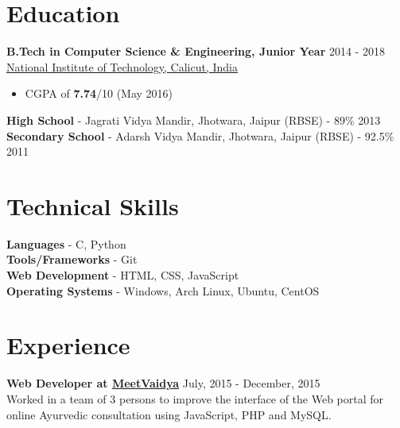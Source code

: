 \documentclass[margin, centered]{res}
\begin{document}
\begin{resume}

\section{Education}
\textbf{B.Tech in Computer Science \& Engineering, Junior Year} \hfill 2014 - 2018 \\
\href{http://nitc.ac.in/}{National Institute of Technology, Calicut, India}
\begin{itemize}
 \item CGPA of \textbf{7.74}/10 (May 2016)
\end{itemize}
\textbf{High School} - {Jagrati Vidya Mandir, Jhotwara, Jaipur} (RBSE) - 89\% \hfill 2013 \\
\textbf{Secondary School} - Adarsh Vidya Mandir, Jhotwara, Jaipur (RBSE) - 92.5\% \hfill 2011

\section{Technical \hspace{2mm} Skills}
\textbf{Languages} - C, Python\\
\textbf{Tools/Frameworks} - Git\\
\textbf{Web Development} - HTML, CSS, JavaScript\\
\textbf{Operating Systems} - Windows, Arch Linux, Ubuntu, CentOS

\section{Experience}
\textbf{Web Developer at \href{http://www.meetvaidya.com}{MeetVaidya}} \hfill July, 2015 - December, 2015\\
Worked in a team of 3 persons to improve the interface of the Web portal for online Ayurvedic consultation using JavaScript, PHP and MySQL.


\end{resume}
\end{document}
